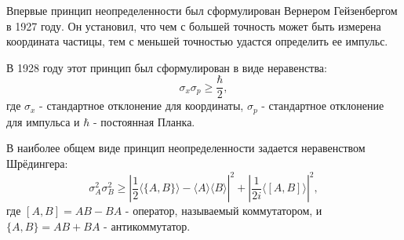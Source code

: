 \documentclass[%
master,         %
subf,           %
href,           %
colorlinks=true %
]{disser}
\numberwithin{equation}{section}
\numberwithin{figure}{section}
\begin{document}
Впервые принцип неопределенности был сформулирован Вернером Гейзенбергом в 1927 году. Он установил, что чем с большей точность может быть измерена координата частицы, тем с меньшей точностью удастся определить ее импульс.

В 1928 году этот принцип был сформулирован в виде неравенства:
\[
\sigma_x\sigma_p \geq \frac{\hbar}{2},
\]
где $\sigma_x$  - стандартное отклонение для координаты, $\sigma_p$ - стандартное отклонение для импульса и $\hbar$ - постоянная Планка.

В наиболее общем виде принцип неопределенности задается неравенством Шрёдингера:
\begin{equation}
\sigma_A^2\sigma_B^2 \geq \left| \frac{1}{2}\langle\{A, B\}\rangle - \langle A\rangle\langle B\rangle \right|^2 + \left| \frac{1}{2i}\langle [A, B]\rangle\right|^2,
\label{eq:Schrodinger_ineq}
\end{equation}
где $[A, B] = AB - BA$ - оператор, называемый коммутатором, и $\{A, B\} = AB + BA$ - антикоммутатор.
\end{document}
